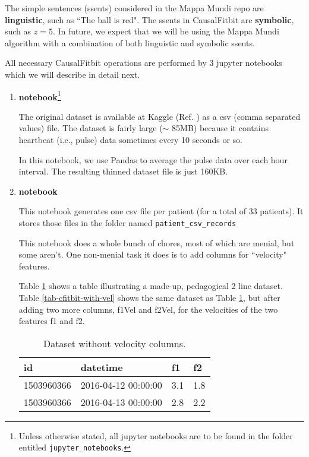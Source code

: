 \documentclass[12pt]{article}
\begin{document}
The simple sentences (ssents)
considered in the Mappa Mundi
repo are {\bf linguistic}, such as ``The ball is red". The ssents in 
CausalFitbit are {\bf symbolic},
such as $z=5$. In future,
we expect that we will be using 
the Mappa Mundi algorithm
with a combination of both
linguistic and symbolic ssents.

All necessary 
CausalFitbit 
operations are performed
by 3 jupyter notebooks
which we will describe in detail next.

\begin{enumerate}

\item {\bf {\color{red}{\tt heartrate\_data\_thinning.ipynb} } notebook}\footnote{Unless otherwise stated,
all jupyter  notebooks
are to be found in the folder entitled
{\tt jupyter\_notebooks}.}


The original dataset is available at  Kaggle (Ref. \cite{fitbit-dataset}) as a csv (comma separated values) file. The
dataset is fairly large ($\sim$ 85MB)
because it contains heartbeat (i.e., pulse) data sometimes every 10 seconds or so. 

In this notebook, we use Pandas to average the pulse data over each hour interval.  The resulting thinned dataset file
is just 160KB.  
 \item {\bf {\color{red}{\tt data\_preparation.ipynb}} notebook}


This notebook generates one 
 csv  file per patient (for a total of 33 patients). It
 stores those files in the folder named 
 {\tt patient\_csv\_records} 
 
 This notebook does a whole
 bunch of chores, most of which are  
 menial, but some aren't.
 One non-menial task it does is to add columns for ``velocity" features.
  
  
  Table \ref{tab-cfitbit-without-vel}
  shows a table illustrating a made-up, pedagogical 2 line dataset. Table \ref{tab-cfitbit-with-vel}
  shows the same
  dataset as Table \ref{tab-cfitbit-without-vel}, but after
  adding two more columns, f1Vel and f2Vel,
  for the velocities of the two features f1 and f2. 


\begin{table}[h!]
\centering
\begin{tabular}{|l|l|l|l|}
\hline
\rowcolor[HTML]{FFFFC7} 
id & datetime & f1 & f2 \\ \hline
1503960366 & 2016-04-12 00:00:00 & 3.1 & 1.8 \\ \hline
1503960366 & 2016-04-13 00:00:00 & 2.8 & 2.2 \\ \hline
\end{tabular}
\caption{Dataset without velocity columns.}
\label{tab-cfitbit-without-vel}
\end{table}



\end{enumerate}
\end{document}
